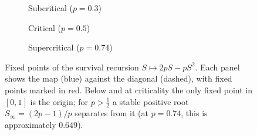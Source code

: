 \begin{figure}[htbp]
    \centering
    \begin{subfigure}[b]{0.325\textwidth}
        \centering
        \caption{Subcritical ($p = 0.3$)}
    \end{subfigure}
    \hfill
    \begin{subfigure}[b]{0.325\textwidth}
        \centering
        \caption{Critical ($p = 0.5$)}
    \end{subfigure}
    \hfill
    \begin{subfigure}[b]{0.325\textwidth}
        \centering
        \caption{Supercritical ($p = 0.74$)}
    \end{subfigure}

    \caption{Fixed points of the survival recursion $S\mapsto 2pS-pS^2$. Each panel shows the map (blue) against the diagonal (dashed), with fixed points marked in red. Below and at criticality the only fixed point in $[0,1]$ is the origin; for $p>\tfrac12$ a stable positive root $S_\infty=(2p-1)/p$ separates from it (at $p=0.74$, this is approximately $0.649$).}
    \label{fig:phase_transition}
\end{figure}
\FloatBarrier

